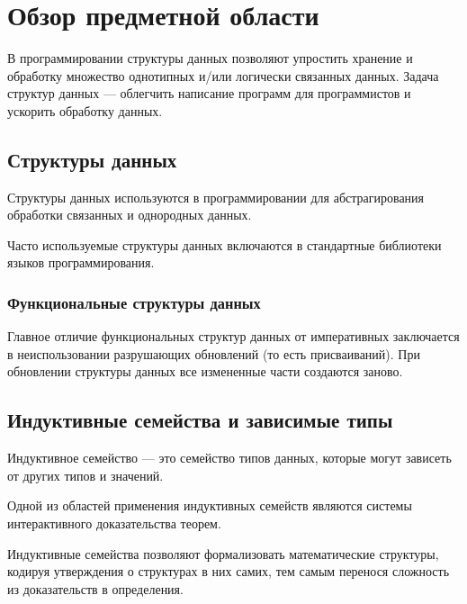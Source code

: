 \chapter{Обзор предметной области}
\label{chapter1}

В программировании структуры данных позволяют упростить хранение и обработку
множество однотипных и/или логически связанных данных.
Задача структур данных — облегчить написание программ для программистов и
ускорить обработку данных.

\section{Структуры данных}
Структуры данных используются в программировании для абстрагирования
обработки связанных и однородных данных.

Часто используемые структуры данных включаются в стандартные библиотеки
языков программирования.

\subsection{Функциональные структуры данных}

Главное отличие функциональных структур данных от императивных \cite{OkasakiBook}
заключается в неиспользовании разрушающих обновлений (то есть присваиваний).
При обновлении структуры данных все измененные части создаются заново.

\section{Индуктивные семейства и зависимые типы}

\begin{definition}
Индуктивное семейство \cite{DybjerIndFam}— это семейство типов данных,
которые могут зависеть от других типов и значений.
\end{definition}

Одной из областей применения индуктивных семейств являются системы интерактивного
доказательства теорем.

Индуктивные семейства позволяют формализовать математические структуры,
кодируя утверждения о структурах в них самих, тем самым перенося сложность из
доказательств в определения.

\iffalse
\fi

